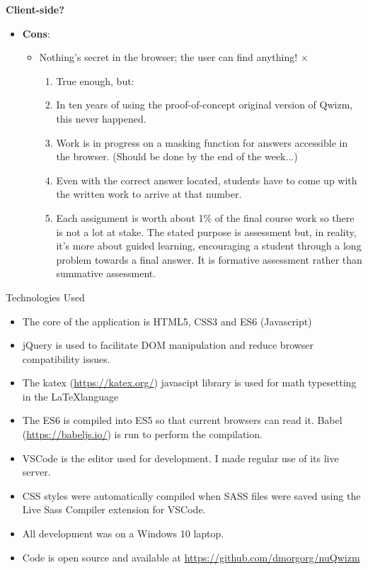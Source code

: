\documentclass[11pt,xcolor={svgnames, x11names}]{beamer}
\begin{document}
\begin{frame}{\bf Client-side?}
 
	\begin{itemize}			
		\item<1->[] \textcolor{saitMaroon}{\bf Cons}:
		\begin{itemize}	
		
		\item Nothing's secret in the browser; the user can find anything! \textcolor{saitMaroon}{\large $\bm \times $}\parm \pause
			\begin{enumerate} [<+->]				
				\item[] True enough, but:	\parm			
				\item In ten years of using the proof-of-concept original version of Qwizm, this never happened. \pars
				\item Work is in progress on a masking function for answers accessible in the browser. (Should be done by the end of the week...)\pars
				\item Even with the correct answer located, students have to come up with the written work to arrive at that number. \pars
				\item Each assignment is worth about 1\% of the final course work so there is not a lot at stake. \pars The stated purpose is assessment but, in reality, it's more about guided learning, encouraging a student through a long problem towards a final answer. It is formative assessment rather than summative assessment.
					
			\end{enumerate} 
		\end{itemize}
	\end{itemize}
\end{frame}

\begin{frame}{Technologies Used}
	\begin{itemize}
	 	\item The core of the application is HTML5, CSS3 and ES6 (Javascript)
	 	\item jQuery is used to facilitate DOM manipulation and reduce browser compatibility issues.
	 	\item The katex ({\small\url{https://katex.org/}}) javascipt library is used for math typesetting in the \LaTeX language
	 	\item The ES6 is compiled into ES5 so that current browsers can read it. Babel ({\small\url{https://babeljs.io/}}) is run to perform the compilation.
	 	\item VSCode is the editor used for development. I made regular use of its live server.
	 	\item CSS styles were automatically compiled when SASS files were saved using the Live Sass Compiler extension for VSCode.
		\item All development was on a Windows 10 laptop. 
		\item Code is open source and available at {\small\url{https://github.com/dmorgorg/nuQwizm}}
	 	
	\end{itemize}
\end{frame}
\end{document}
